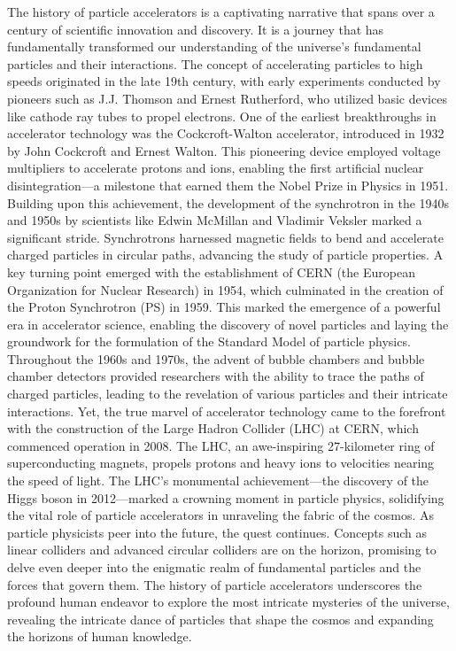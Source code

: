 The history of particle accelerators is a captivating narrative that spans over a century of
scientific innovation and discovery. It is a journey that has fundamentally transformed our
understanding of the universe's fundamental particles and their interactions. The concept of
accelerating particles to high speeds originated in the late 19th century, with early experiments
conducted by pioneers such as J.J. Thomson and Ernest Rutherford, who utilized basic devices like
cathode ray tubes to propel electrons.  One of the earliest breakthroughs in accelerator technology
was the Cockcroft-Walton accelerator, introduced in 1932 by John Cockcroft and Ernest Walton. This
pioneering device employed voltage multipliers to accelerate protons and ions, enabling the first
artificial nuclear disintegration—a milestone that earned them the Nobel Prize in Physics in 1951.
Building upon this achievement, the development of the synchrotron in the 1940s and 1950s by
scientists like Edwin McMillan and Vladimir Veksler marked a significant stride. Synchrotrons
harnessed magnetic fields to bend and accelerate charged particles in circular paths, advancing the
study of particle properties.  A key turning point emerged with the establishment of CERN (the
European Organization for Nuclear Research) in 1954, which culminated in the creation of the Proton
Synchrotron (PS) in 1959. This marked the emergence of a powerful era in accelerator science,
enabling the discovery of novel particles and laying the groundwork for the formulation of the
Standard Model of particle physics. Throughout the 1960s and 1970s, the advent of bubble chambers
and bubble chamber detectors provided researchers with the ability to trace the paths of charged
particles, leading to the revelation of various particles and their intricate interactions.  Yet,
the true marvel of accelerator technology came to the forefront with the construction of the Large
Hadron Collider (LHC) at CERN, which commenced operation in 2008. The LHC, an awe-inspiring
27-kilometer ring of superconducting magnets, propels protons and heavy ions to velocities nearing
the speed of light. The LHC's monumental achievement—the discovery of the Higgs boson in 2012—marked
a crowning moment in particle physics, solidifying the vital role of particle accelerators in
unraveling the fabric of the cosmos.  As particle physicists peer into the future, the quest
continues. Concepts such as linear colliders and advanced circular colliders are on the horizon,
promising to delve even deeper into the enigmatic realm of fundamental particles and the forces that
govern them. The history of particle accelerators underscores the profound human endeavor to explore
the most intricate mysteries of the universe, revealing the intricate dance of particles that shape
the cosmos and expanding the horizons of human knowledge.



